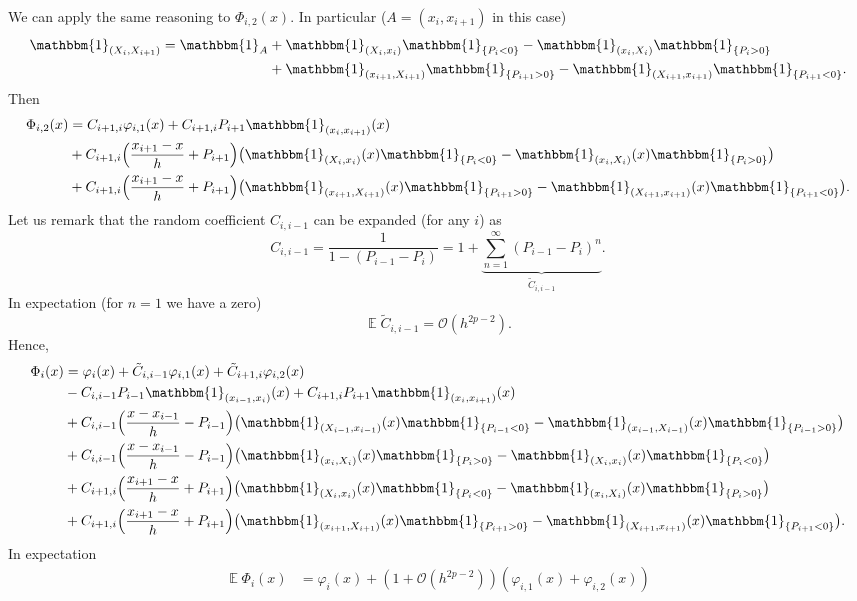\documentclass{siamart1116}
\numberwithin{theorem}{section}
\renewcommand{\phi}{\varphi}
\newcommand{\OO}{\mathcal{O}}
\newcommand{\E}{\operatorname{\mathbb{E}}}
\newcommand{\ind}[1]{\mathbbm{1}_{#1}}
\begin{document}
We can apply the same reasoning to $\Phi_{i, 2}(x)$. In particular ($A = (x_i, x_{i+1})$ in this case)
\begin{equation}
\begin{aligned}
\ind{(X_i, X_{i+1})} = \ind{A} &+ \ind{(X_i, x_i)}\ind{\{P_i < 0\}} - \ind{(x_i, X_i)}\ind{\{P_i > 0\}}	\\
							   &+ \ind{(x_{i+1}, X_{i+1})}\ind{\{P_{i+1} > 0\}} - \ind{(X_{i+1}, x_{i+1})}\ind{\{P_{i+1} < 0\}}.
\end{aligned}
\end{equation}
Then
\begin{equation}
\begin{aligned}
	\Phi_{i, 2}(x) &= C_{i+1, i}\phi_{i, 1}(x) + C_{i+1, i}P_{i+1}\ind{(x_i, x_{i+1})}(x) \\
	&+ C_{i+1, i}\Big(\frac{x_{i+1}-x}{h} + P_{i+1}\Big)\big(\ind{(X_i, x_i)}(x)\ind{\{P_i < 0\}} - \ind{(x_i, X_i)}(x)\ind{\{P_i > 0\}}\big)\\
	&+ C_{i+1, i}\Big(\frac{x_{i+1}-x}{h} + P_{i+1}\Big)\big(\ind{(x_{i+1}, X_{i+1})}(x)\ind{\{P_{i+1} > 0\}} - \ind{(X_{i+1}, x_{i+1})}(x)\ind{\{P_{i+1} < 0\}}\big).
\end{aligned}
\end{equation}
Let us remark that the random coefficient $C_{i, i-1}$ can be expanded (for any $i$) as
\begin{equation}
	C_{i, i-1} = \frac{1}{1 - (P_{i-1} - P_{i})} = 1 + \underbrace{\sum_{n=1}^\infty (P_{i-1}-P_i)^n}_{\tilde C_{i, i-1}}.
\end{equation}
In expectation (for $n = 1$ we have a zero)
\begin{equation}
	\E \tilde C_{i, i-1} = \OO(h^{2p-2}).
\end{equation}
Hence,
\begin{equation}
\begin{aligned}
	\Phi_i(x) &= \phi_i(x) + \tilde C_{i, i-1} \phi_{i, 1}(x) + \tilde C_{i+1, i} \phi_{i, 2}(x)\\
	&- C_{i, i-1}P_{i-1}\ind{(x_{i-1}, x_i)}(x) + C_{i+1, i}P_{i+1}\ind{(x_i, x_{i+1})}(x) \\
	&+ C_{i, i-1}\Big(\frac{x - x_{i-1}}{h} - P_{i-1}\Big)\big(\ind{(X_{i-1}, x_{i-1})}(x)\ind{\{P_{i-1} < 0\}} - \ind{(x_{i-1}, X_{i-1})}(x)\ind{\{P_{i-1} > 0\}}\big)\\
	&+ C_{i, i-1}\Big(\frac{x - x_{i-1}}{h} - P_{i-1}\Big)\big(\ind{(x_i, X_i)}(x)\ind{\{P_i > 0\}} - \ind{(X_i, x_i)}(x)\ind{\{P_i < 0\}}\big)\\
	&+ C_{i+1, i}\Big(\frac{x_{i+1}-x}{h} + P_{i+1}\Big)\big(\ind{(X_i, x_i)}(x)\ind{\{P_i < 0\}} - \ind{(x_i, X_i)}(x)\ind{\{P_i > 0\}}\big)\\
	&+ C_{i+1, i}\Big(\frac{x_{i+1}-x}{h} + P_{i+1}\Big)\big(\ind{(x_{i+1}, X_{i+1})}(x)\ind{\{P_{i+1} > 0\}} - \ind{(X_{i+1}, x_{i+1})}(x)\ind{\{P_{i+1} < 0\}}\big).	
\end{aligned}
\end{equation}
In expectation
\begin{equation}
\begin{aligned}
	\E\Phi_i(x) &= \phi_i(x) + (1 + \OO(h^{2p-2})) (\phi_{i, 1}(x) + \phi_{i, 2}(x))
\end{aligned}
\end{equation}
%
%
\end{document}
